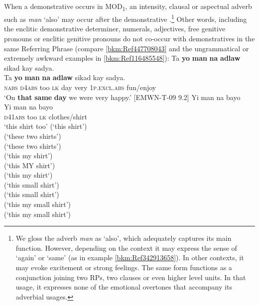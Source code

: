 When a demonstrative occurs in MOD\textsubscript{1}, an intensity, clausal or aspectual adverb such as \textit{man} ‘also’ may occur after the demonstrative .\footnote{We gloss the adverb \textit{man} as ‘also’, which adequately captures its main function. However, depending on the context it may express the sense of ‘again’ or ‘same’ (as in example \ref{bkm:Ref342913658}). In other contexts, it may evoke excitement or strong feelings. The same form functions as a conjunction joining two RPs, two clauses or even higher level units. In that usage, it expresses none of the emotional overtones that accompany its adverbial usages.}  Other words, including the enclitic demonstrative determiner, numerals, adjectives, free genitive pronouns or enclitic genitive pronouns do not co-occur with demonstratives in the same Referring Phrase (compare \ref{bkm:Ref447708043} and the ungrammatical or extremely awkward examples in \ref{bkm:Ref116485548}):
\ea
\label{bkm:Ref342913658}
Ta  \textbf{yo}  \textbf{man}  \textbf{na}  \textbf{adlaw}  sikad  kay  sadya. \\\smallskip
 \gll Ta  \textbf{yo}  \textbf{man}  \textbf{na}  \textbf{adlaw}  sikad  kay  sadya. \\
\textsc{nabs}  \textsc{d}4\textsc{abs}  too  \textsc{lk}  day  very  1\textsc{p.excl.abs}  fun/enjoy \\
\glt ‘On \textbf{that} \textbf{same} \textbf{day} we were very happy.’ [EMWN-T-09 9.2]
\z
\ea
\label{bkm:Ref447708043}
Yi  man  na  bayo \\\smallskip
 \gll Yi  man  na  bayo \\
\textsc{d}41\textsc{abs}  too  \textsc{lk}  clothes/shirt \\
\glt  ‘this shirt too’
\z
\ea
\label{bkm:Ref116485548}
 (‘this shirt’) \\
(‘these two shirts’) \\
(‘these two shirts’) \\
 (‘this my shirt’) \\
(‘this MY shirt’) \\
 (‘this my shirt‘) \\
  (‘this small shirt') \\
  (‘this small shirt') \\
    (‘this my small shirt') \\
    (‘this my small shirt')
\z
\z

